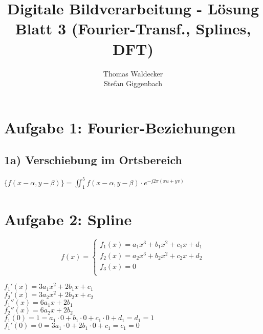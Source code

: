 \documentclass[a4paper,10pt]{scrartcl}
\title{Digitale Bildverarbeitung - Lösung Blatt 3 (Fourier-Transf., Splines, DFT)}
\author{Thomas Waldecker\\
	Stefan Giggenbach}
\begin{document}
\maketitle

\section{Aufgabe 1: Fourier-Beziehungen}
\subsection{1a) Verschiebung im Ortsbereich}

$\{f(x-\alpha,y-\beta)\}=\iint_{1}^{5}{f(x-\alpha,y-\beta)\cdot e^{-j2\pi(xu+yv)}}$



\section{Aufgabe 2: Spline}

\begin{displaymath}
f(x) = 
 \left\{ 
  \begin{array}{l}
   f_1(x) = a_1x^3 + b_1x^2 + c_1x + d_1\\
   f_2(x) = a_2x^3 + b_2x^2 + c_2x + d_2\\
   f_3(x) = 0\\
  \end{array} 
   \right.
\end{displaymath}

$f_1'(x) = 3a_1x^2 + 2b_1x + c_1 $\\
$f_2'(x) = 3a_2x^2 + 2b_2x + c_2 $\\

$f_1''(x) = 6a_1x + 2b_1$\\
$f_2''(x) = 6a_2x + 2b_2$\\

$f_1(0) = 1 = a_1 \cdot 0 + b_1 \cdot 0 + c_1 \cdot 0 + d_1 = d_1 = 1$\\
$f_1'(0) = 0 = 3a_1 \cdot 0 + 2b_1 \cdot 0 + c_1 = c_1 = 0$\\
\end{document}
